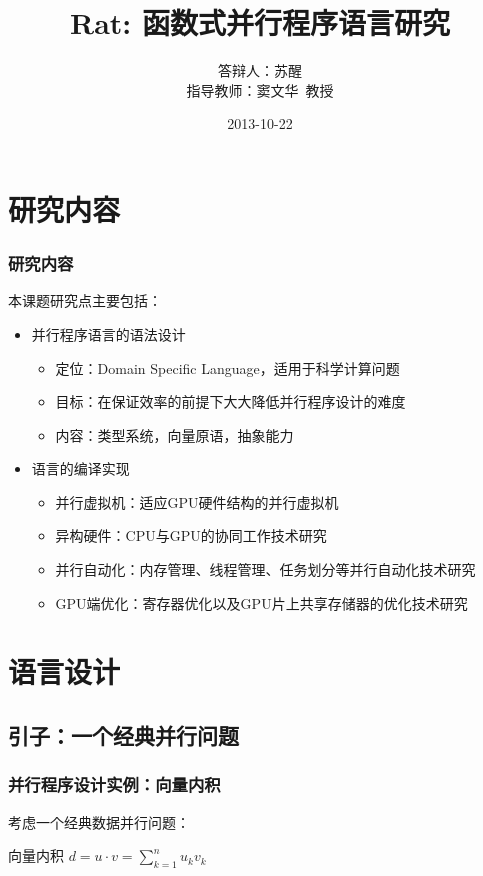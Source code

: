\documentclass{beamer}
\title{Rat: 函数式并行程序语言研究}
\author[苏醒~pysuxing@gmail.com]{
\begin{tabular}{ll}
答辩人： & 苏醒 \\
指导教师： & 窦文华~教授
\end{tabular}
}
\institute{计算机所641教研室}
\date{2013-10-22}
\begin{document}
\setlength{\parindent}{0pt}
\begin{frame}
  \titlepage
\end{frame}

\begin{frame}
  \tableofcontents
\end{frame}

\section{研究内容}
\frame{\tableofcontents[currentsection]}
\begin{frame}
  \frametitle{研究内容}
  本课题研究点主要包括：
  \begin{itemize}
    \item 并行程序语言的语法设计
      \begin{itemize}
        \item 定位：Domain Specific Language，适用于科学计算问题
        \item 目标：在保证效率的前提下大大降低并行程序设计的难度
        \item 内容：类型系统，向量原语，抽象能力
      \end{itemize}
      \pause
    \item 语言的编译实现
      \begin{itemize}
        \item 并行虚拟机：适应GPU硬件结构的并行虚拟机
        \item 异构硬件：CPU与GPU的协同工作技术研究
        \item 并行自动化：内存管理、线程管理、任务划分等并行自动化技术研究
        \item GPU端优化：寄存器优化以及GPU片上共享存储器的优化技术研究
      \end{itemize}
  \end{itemize}
\end{frame}

\section{语言设计}
\frame{\tableofcontents[currentsection]}
\subsection{引子：一个经典并行问题}
\begin{frame}[t]
  \frametitle{并行程序设计实例：向量内积}
  考虑一个经典数据并行问题：
  \begin{block}{向量内积}
    $d=u \cdot v = \sum_{k=1}^nu_kv_k$
  \end{block}

\end{frame}
\end{document}
